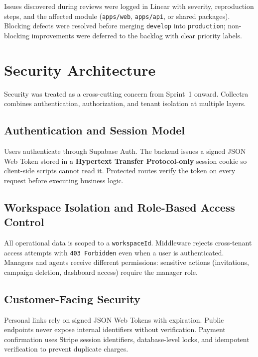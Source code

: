 \documentclass[12pt,a4paper]{report}
\begin{document}
Issues discovered during reviews were logged in Linear with severity, reproduction steps,
and the affected module (\texttt{apps/web}, \texttt{apps/api}, or shared packages).
Blocking defects were resolved before merging \texttt{develop} into \texttt{production};
non-blocking improvements were deferred to the backlog with clear priority labels.

\section{Security Architecture}
\label{sec:security}

Security was treated as a cross-cutting concern from Sprint~1 onward.
Collectra combines authentication, authorization, and tenant isolation at multiple layers.

\subsection{Authentication and Session Model}

Users authenticate through Supabase Auth.
The backend issues a signed JSON Web Token stored in a \textbf{Hypertext Transfer Protocol-only}
session cookie so client-side scripts cannot read it.
Protected routes verify the token on every request before executing business logic.

\subsection{Workspace Isolation and Role-Based Access Control}

All operational data is scoped to a \texttt{workspaceId}.
Middleware rejects cross-tenant access attempts with \texttt{403 Forbidden} even when a user
is authenticated.
Managers and agents receive different permissions: sensitive actions (invitations, campaign
deletion, dashboard access) require the manager role.

\subsection{Customer-Facing Security}

Personal links rely on signed JSON Web Tokens with expiration.
Public endpoints never expose internal identifiers without verification.
Payment confirmation uses Stripe session identifiers, database-level locks, and idempotent
verification to prevent duplicate charges.
\end{document}
